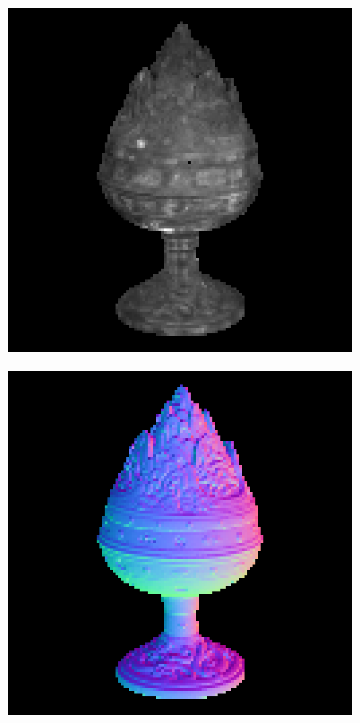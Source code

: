 \begin{figure}
\begin{subfigure}[b]{0.19\linewidth}
	\includegraphics[width=\linewidth]{./Figures/gcnn_synthetic/fancy_eval_2_img.png}
	\end{subfigure}
	\begin{subfigure}[b]{0.19\linewidth}
		\includegraphics[width=\linewidth]{./Figures/gcnn_synthetic/fancy_eval_2_groundtruth.png}

\end{subfigure}
\end{figure}
